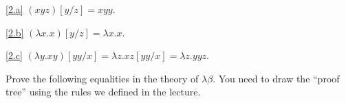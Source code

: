 \documentclass{homework}
\begin{document}
\begin{solution}
  \ref{2.a}
  $(xyz)[y/z] = xyy$.

  \ref{2.b}
  $(\lambda x.x)[y/z] = \lambda x.x$.

  \ref{2.c}
  $(\lambda y.xy)[yy/x] = \lambda z.xz[yy/x] = \lambda z.yyz$.
\end{solution}

\begin{problem}
  Prove the following equalities in the theory of $\lambda\beta$.
  You need to draw the ``proof tree'' using the rules we defined in the lecture.
\end{problem}
\end{document}
